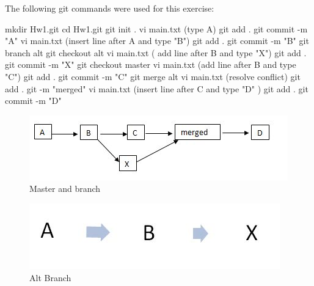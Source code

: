 \documentclass[12pt]{article}
\begin{document}
The following git commands were used for this exercise:

 mkdir Hw1.git\newline
 cd Hw1.git\newline
 git init .\newline
 vi main.txt  (type A)\newline
 git add . \newline
 git commit -m "A" \newline
 vi main.txt  (insert line after A and type "B")
\newline
 git add . \newline
 git commit -m "B"\newline
 git branch alt \newline
 git checkout alt \newline
 vi main.txt ( add line after B and type "X")
\newline
 git add . \newline
 git commit -m "X" \newline
 git checkout master\newline
 vi main.txt (add line after B and type "C")
  \newline
 git add . \newline 
 git commit -m "C" \newline
 git merge alt \newline
 vi main.txt  (resolve conflict)
\newline
 git add .\newline
 git -m "merged" \newline
 vi main.txt (insert line after C and type "D" )
\newline
 git add .
\newline
 git commit -m "D"

\begin{figure}[h]
    \begin{center}
        \includegraphics[width=\textwidth]{Hw1Map.jpg}
    \end{center}
    \caption{Master and branch}
    \label{fig:Hw1Map}
\end{figure}

\begin{figure}[h]
    \begin{center}
        \includegraphics[width=\textwidth]{AltMap.jpg}
    \end{center}
    \caption{Alt Branch}
    \label{fig:Hw1Map}
\end{figure}
\end{document}
